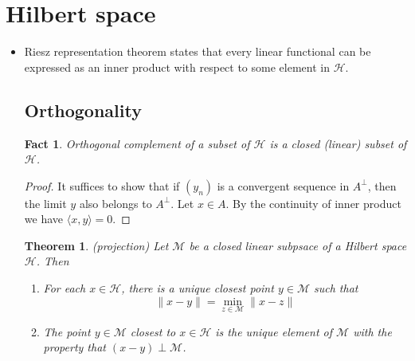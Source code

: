 \documentclass[11pt,reqno]{amsart}
\newtheorem{fact}{Fact}
\newtheorem{theorem}{Theorem}
\theoremstyle{remark}
\begin{document}
\begin{sloppypar}
\section*{Hilbert space}
\begin{itemize}
\item Riesz representation theorem states that every linear functional can be expressed as an inner product with respect to some element in $\mathcal{H}$.
\subsection*{Orthogonality}
\begin{fact}
Orthogonal complement of a subset of $\mathcal{H}$ is a closed (linear) subset of $\mathcal{H}$.
\end{fact}
\begin{proof}
It suffices to show that if $(y_n)$ is a convergent sequence in $A^\perp$, then the limit $y$ also belongs to $A^\perp$.
 Let $x\in A$. By the continuity of inner product we have $\langle x,y\rangle=0$.
\end{proof}

\begin{theorem} (projection)
Let $\mathcal{M}$ be a closed linear subpsace of a Hilbert space $\mathcal{H}$. Then
\begin{enumerate}
\item For each $x\in \mathcal{H}$, there is a unique closest point $y\in\mathcal{M}$ such that 
\begin{equation}
\lVert x-y\rVert = \min_{z\in\mathcal{M}}\lVert x-z\rVert
\end{equation}
\item The point $y\in\mathcal{M}$ closest to $x\in\mathcal{H}$ is the unique element of $\mathcal{M}$ with the
 property that $(x-y)\perp\mathcal{M}$.
\end{enumerate}
\end{theorem}
\end{itemize}
\end{sloppypar}
\end{document}
